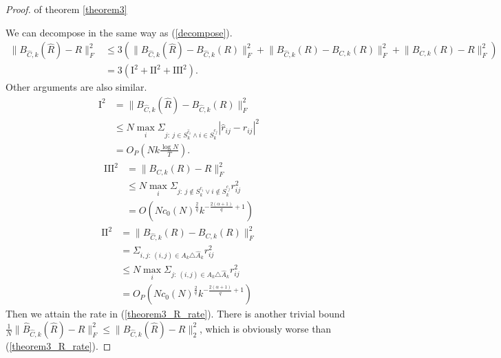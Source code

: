 \begin{proof}{of theorem \ref{theorem3}}

We can decompose in the same way as (\ref{decompose}). 
\begin{equation}
	\begin{split}
        \lVert B_{\hat{C}, k}(\hat R) - R \rVert_F^2 &\leq 
            3 (\lVert B_{\hat{C}, k}(\hat R) - B_{\hat{C}, k}(R) \rVert_F^2 + 
        	\lVert  B_{\hat{C}, k}(R) - B_{C, k}(R) \rVert_F^2 + 
            \lVert B_{C, k}(R) - R \rVert_F^2 ) \\
        &= 3 (\mathrm{I}^2 + \mathrm{II}^2 + \mathrm{III}^2).
    \end{split} 
    \label{decompose}
\end{equation}
Other arguments are also similar.
\begin{equation}
    \begin{split}
        \mathrm{I}^2 &= \lVert B_{\hat{C}, k}(\hat R) - B_{\hat{C}, k}(R) \rVert_F^2 \\   
        &\leq N \max_i \Sigma_{j:\ j\in S_{k}^{\hat c_i} \land i\in S_{k}^{\hat c_j}} 
            |\hat r_{ij} - r_{ij}|^2 \\
        &= O_P(Nk \frac{\log N}{T}).
    \end{split}
\end{equation}
\begin{equation}
    \begin{split}
        \mathrm{III}^2 &= \lVert B_{C,k}(R) - R \rVert_F^2 \\
        &\leq N \max_i 
            \Sigma_{j:\ j \notin S_{k}^{c_i} \lor i \notin S_{k}^{c_j}}  
            r_{ij}^2 \\
        &= O(N c_0(N)^{\frac{2}{q}} k^{-\frac{2(\alpha+1)}{q}+1} )
    \end{split}
\end{equation} 
\begin{equation}
    \begin{split}
        \mathrm{II}^2 &= \lVert B_{\hat{C}, k}(R) - B_{C, k}(R)  \rVert_F^2 \\
        &= \Sigma_{i,j:\ (i,j)\in A_k \triangle \hat A_k}  r_{ij}^2 \\
        &\leq N \max_i \Sigma_{j:\ (i,j)\in A_k \triangle \hat A_k}  r_{ij}^2 \\
        &= O_P(N c_0(N)^{\frac{2}{q}} k^{-\frac{2(\alpha+1)}{q}+1} )
    \end{split}
\end{equation}
Then we attain the rate in (\ref{theorem3_R_rate}). There is another trivial bound $\frac{1}{N} \lVert \hat B_{\hat C, k}(\hat R) - R \rVert_F^2 \leq \lVert \hat B_{\hat C, k}(\hat R) - R \rVert_2^2$, which is obviously worse than (\ref{theorem3_R_rate}). 


\end{proof}
